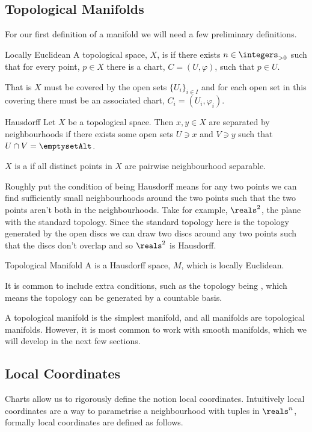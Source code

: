\subsection{Topological Manifolds}
For our first definition of a manifold we will need a few preliminary definitions.
\begin{dfn}{Locally Euclidean}{}
    A topological space, \(X\), is  if there exists \(n \in \integers_{>0}\) such that for every point, \(p \in X\) there is a chart, \(C = (U, \varphi)\), such that \(p \in U\).
\end{dfn}

That is \(X\) must be covered by the open sets \(\{U_i\}_{i\in I}\) and for each open set in this covering there must be an associated chart, \(C_i = (U_i, \varphi_i)\).

\begin{dfn}{Hausdorff}{}
    Let \(X\) be a topological space.
    Then \(x, y \in X\) are separated by neighbourhoods if there exists some open sets \(U \ni x\) and \(V \ni y\) such that \(U \cap V = \emptysetAlt\).
    
    \(X\) is a  if all distinct points in \(X\) are pairwise neighbourhood separable.
\end{dfn}
Roughly put the condition of being Hausdorff means for any two points we can find sufficiently small neighbourhoods around the two points such that the two points aren't both in the neighbourhoods.
Take for example, \(\reals^2\), the plane with the standard topology.
Since the standard topology here is the topology generated by the open discs we can draw two discs around any two points such that the discs don't overlap and so \(\reals^2\) is Hausdorff.

\begin{dfn}{Topological Manifold}{}
    A  is a Hausdorff space, \(M\), which is locally Euclidean.
\end{dfn}

It is common to include extra conditions, such as the topology being , which means the topology can be generated by a countable basis.

A topological manifold is the simplest manifold, and all manifolds are topological manifolds.
However, it is most common to work with smooth manifolds, which we will develop in the next few sections.

\subsection{Local Coordinates}
Charts allow us to rigorously define the notion local coordinates.
Intuitively local coordinates are a way to parametrise a neighbourhood with tuples in \(\reals^n\), formally local coordinates are defined as follows.


